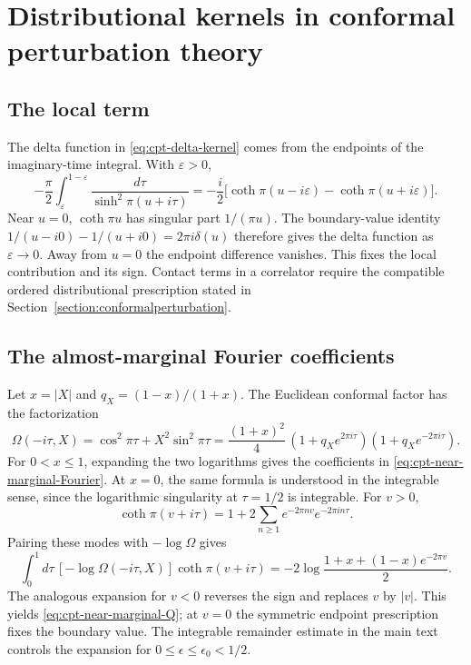 \documentclass[a4paper,11pt]{article}
\theoremstyle{definition}
\begin{document}
\section{Distributional kernels in conformal perturbation theory}\label{app:kernels}

\subsection{The local term}

The delta function in \eqref{eq:cpt-delta-kernel} comes from the endpoints of the imaginary-time integral. With $\varepsilon>0$,
\begin{equation}
 -\frac\pi2\int_\varepsilon^{1-\varepsilon}\frac{d\tau}{\sinh^2\pi(u+i\tau)}
 =-\frac i2\bigl[\coth\pi(u-i\varepsilon)-\coth\pi(u+i\varepsilon)\bigr].
 \label{eq:appB-local}
\end{equation}
Near $u=0$, $\coth\pi u$ has singular part $1/(\pi u)$. The boundary-value identity $1/(u-i0)-1/(u+i0)=2\pi i\delta(u)$ therefore gives the delta function as $\varepsilon\to0$. Away from $u=0$ the endpoint difference vanishes. This fixes the local contribution and its sign. Contact terms in a correlator require the compatible ordered distributional prescription stated in Section~\ref{section:conformalperturbation}.

\subsection{The almost-marginal Fourier coefficients}

Let $x=|X|$ and $q_X=(1-x)/(1+x)$. The Euclidean conformal factor has the factorization
\begin{equation}
 \Omega(-i\tau,X)=\cos^2\pi\tau+X^2\sin^2\pi\tau
 =\frac{(1+x)^2}4\,(1+q_Xe^{2\pi i\tau})(1+q_Xe^{-2\pi i\tau}).
 \label{eq:appB-factorization}
\end{equation}
For $0<x\le1$, expanding the two logarithms gives the coefficients in \eqref{eq:cpt-near-marginal-Fourier}. At $x=0$, the same formula is understood in the integrable sense, since the logarithmic singularity at $\tau=1/2$ is integrable. For $v>0$,
\begin{equation}
 \coth\pi(v+i\tau)=1+2\sum_{n\ge1}e^{-2\pi nv}e^{-2\pi in\tau}.
 \label{eq:appB-coth}
\end{equation}
Pairing these modes with $-\log\Omega$ gives
\begin{equation}
 \int_0^1d\tau\,[-\log\Omega(-i\tau,X)]\coth\pi(v+i\tau)
 =-2\log\frac{1+x+(1-x)e^{-2\pi v}}2 .
 \label{eq:appB-paired}
\end{equation}
The analogous expansion for $v<0$ reverses the sign and replaces $v$ by $|v|$. This yields \eqref{eq:cpt-near-marginal-Q}; at $v=0$ the symmetric endpoint prescription fixes the boundary value. The integrable remainder estimate in the main text controls the expansion for $0\le\epsilon\le\epsilon_0<1/2$.
\end{document}
